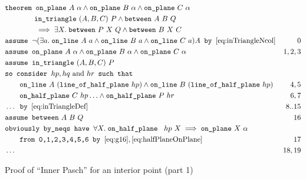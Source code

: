 \begin{boxedfigure}[h]
\small
\begin{align*}
&\texttt{theorem }\texttt{on\_plane}\ A\ \alpha \wedge \texttt{on\_plane}\ B\ \alpha \wedge \texttt{on\_plane}\ C\ \alpha\\
&\qquad\qquad\texttt{in\_triangle}\ (A,B,C)\ P \wedge \texttt{between}\ A\ B\ Q\\
&\qquad\qquad\implies\exists X.\; \texttt{between}\ P\ X\ Q \wedge \texttt{between}\ B\ X\ C\\
&\texttt{assume } \neg(\exists a.\; \texttt{on\_line}\ A\ a\wedge \texttt{on\_line}\ B\ a\wedge \texttt{on\_line}\ C\ a)A \texttt{ by } \eqref{eq:inTriangleNcol}&0\\
&\texttt{assume } \texttt{on\_plane}\ A\ \alpha \wedge \texttt{on\_plane}\ B\ \alpha \wedge \texttt{on\_plane}\ C\ \alpha&1,2,3\\
  &\texttt{assume } \texttt{in\_triangle}\ (A,B,C)\ P\\
  &\texttt{so consider } hp, hq \text{ and } hr \texttt{ such that }\\
&\qquad \texttt{on\_line}\ A\ (\texttt{line\_of\_half\_plane}\ hp) \wedge \texttt{on\_line}\ B\ (\texttt{line\_of\_half\_plane}\ hp)& 4,5\\ 
&\qquad \texttt{on\_half\_plane}\ C\ hp\ldots \wedge \texttt{on\_half\_plane}\ P\ hr & 6,7\\
&\ldots \texttt{ by } \eqref{eq:inTriangleDef} & 8..15\\
&\texttt{assume } \texttt{between}\ A\ B\ Q & 16\\
&\texttt{obviously by\_neqs have } \forall X.\; \texttt{on\_half\_plane }\ hp\ X \implies \texttt{on\_plane}\ X\ \alpha\\ &\qquad\texttt{from 0,1,2,3,4,5,6 by } \eqref{eq:g16}, \eqref{eq:halfPlaneOnPlane}& 17\\
&\ldots & 18,19
\end{align*}
\caption{Proof of ``Inner Pasch'' for an interior point (part 1)}
\label{fig:tricut11}
\end{boxedfigure}

